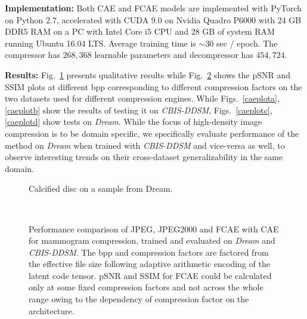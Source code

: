 \documentclass[10pt,twocolumn,letterpaper]{article}
\begin{document}
\textbf{Implementation:} Both CAE and FCAE models are implemented with PyTorch on Python 2.7, accelerated with CUDA 9.0 on Nvidia Quadro P6000 with 24 GB DDR5 RAM on a PC with Intel Core i5 CPU and 28 GB of system RAM running Ubuntu 16.04 LTS. Average training time is $\sim 30$ sec / epoch. The compressor has $268,368$ learnable parameters and decompressor has $454,724$. 

\textbf{Results:} Fig.~\ref{view} presents qualitative results while Fig.~\ref{caeplot} shows the pSNR and SSIM \cite{wang2004image} plots at different bpp corresponding to different compression factors on the two datasets used for different compression engines. While Figs.~\ref{caeplota}, \ref{caeplotb} show the results of testing it on \emph{CBIS-DDSM}, Figs.~\ref{caeplotc}, \ref{caeplotd} show tests on \emph{Dream}. While the focus of high-density image compression is to be domain specific, we specifically evaluate performance of the method on \emph{Dream} when trained with \emph{CBIS-DDSM} and vice-versa as well, to observe interesting trends on their cross-dataset generalizability in the same domain.

\begin{figure}[t]
    \centering
    \caption{Calcified disc on a sample from Dream.}
    \label{view}
\end{figure}


\begin{figure}[t]
    \centering
    \\
    \caption{Performance comparison of JPEG, JPEG2000 and FCAE with CAE for mammogram compression, trained and evaluated on \emph{Dream} and \emph{CBIS-DDSM}. The bpp and compression factors are factored from the effective file size following adaptive arithmetic encoding of the latent code tensor. pSNR and SSIM for FCAE could be calculated only at some fixed compression factors and not across the whole range owing to the dependency of compression factor on the architecture.}
    \label{caeplot}
\end{figure}
\end{document}
